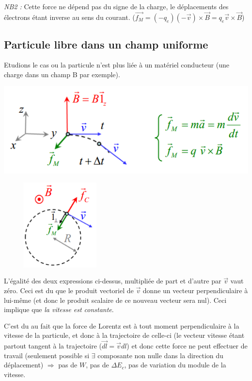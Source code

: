 \documentclass	[11pt, a4paper, openany]{book}
\begin{document}
\textit{NB2 :} Cette force ne dépend pas du signe de la charge, le déplacements des électrons étant inverse au sens du courant. ($\vec{f_M} = (-q_e)(-\vec{v})\times \vec{B} = q_e \vec{v} \times \vec{B}$) \\

\subsection{Particule libre dans un champ uniforme}
Etudions le cas ou la particule n'est plus liée à un matériel conducteur (une charge dans un champ B par exemple).
\begin{center}
	\includegraphics[scale=0.75]{magneto/image2.png}
\end{center}
\begin{figure}
	\includegraphics[width=4cm]{magneto/image3.png}
\end{figure}
L'égalité des deux expressions ci-dessus, multipliée de part et d'autre par $\vec{v}$ vaut zéro. Ceci est du que le produit vectoriel de $\vec{v}$ donne un vecteur perpendiculaire à lui-même (et donc le produit scalaire de ce nouveau vecteur sera nul). Ceci implique que \textit{la vitesse est constante}.

C'est du au fait que la force de Lorentz est à tout moment perpendiculaire à la vitesse de la particule, et donc à la trajectoire de celle-ci (le vecteur vitesse étant partout tangent à la trajectoire ($\vec{dl} = \vec{v}dl$) et donc cette force ne peut effectuer de travail (seulement possible si $\exists$ composante non nulle dans la direction du déplacement) $\Rightarrow$ pas de $W$, pas de $\Delta E_c$, pas de variation du module de la vitesse.\\
\end{document}
